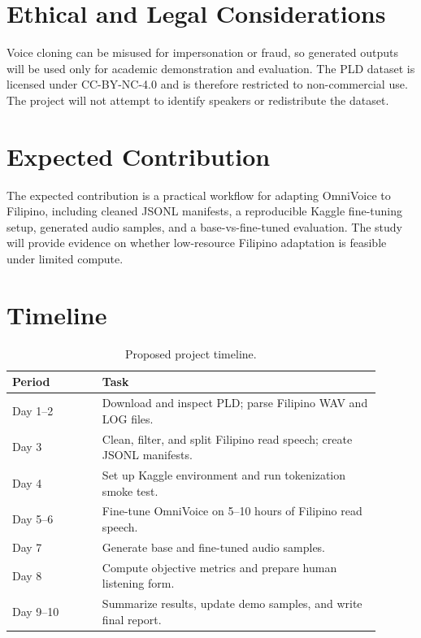 \documentclass[11pt]{article}
\begin{document}
\section{Ethical and Legal Considerations}

Voice cloning can be misused for impersonation or fraud, so generated outputs will be used only for academic demonstration and evaluation. The PLD dataset is licensed under CC-BY-NC-4.0 and is therefore restricted to non-commercial use. The project will not attempt to identify speakers or redistribute the dataset.

\section{Expected Contribution}

The expected contribution is a practical workflow for adapting OmniVoice to Filipino, including cleaned JSONL manifests, a reproducible Kaggle fine-tuning setup, generated audio samples, and a base-vs-fine-tuned evaluation. The study will provide evidence on whether low-resource Filipino adaptation is feasible under limited compute.

\section{Timeline}

\begin{table}[htbp]
  \centering
  \caption{Proposed project timeline.}
  \begin{tabular}{p{0.22\linewidth}p{0.68\linewidth}}
    \toprule
    Period & Task \\
    \midrule
    Day 1--2 & Download and inspect PLD; parse Filipino WAV and LOG files. \\
    Day 3 & Clean, filter, and split Filipino read speech; create JSONL manifests. \\
    Day 4 & Set up Kaggle environment and run tokenization smoke test. \\
    Day 5--6 & Fine-tune OmniVoice on 5--10 hours of Filipino read speech. \\
    Day 7 & Generate base and fine-tuned audio samples. \\
    Day 8 & Compute objective metrics and prepare human listening form. \\
    Day 9--10 & Summarize results, update demo samples, and write final report. \\
    \bottomrule
  \end{tabular}
\end{table}
\end{document}
